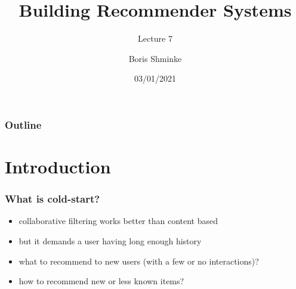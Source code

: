 \documentclass[t]{beamer}
\title{Building Recommender Systems}
\subtitle{Lecture 7}
\author{Boris Shminke}
\institute{Université Côte d'Azur, CNRS, LJAD, France}
\date{03/01/2021}
\begin{document}
\begin{frame}
  \titlepage  
\end{frame}  
\begin{frame}
  \frametitle{Outline}
  \tableofcontents
\end{frame}
\section{Introduction}
\begin{frame}
  \frametitle{What is cold-start?}
  \begin{itemize}
  \item collaborative filtering works better than content based
  \item but it demands a user having long enough history
  \item what to recommend to new users (with a few or no interactions)?
  \item how to recommend new or less known items?
  \end{itemize}
\end{frame}
\end{document}

